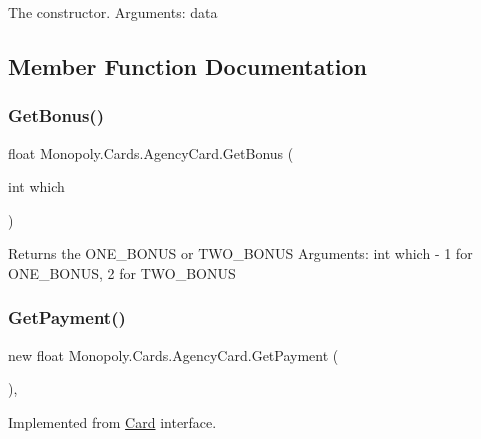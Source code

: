 The constructor. Arguments\+: data 

\subsection{Member Function Documentation}
\mbox{\label{class_monopoly_1_1_cards_1_1_agency_card_af4892a0f8424badd42a01306e705e619}} 
\subsubsection{\texorpdfstring{Get\+Bonus()}{GetBonus()}}
{\footnotesize\ttfamily float Monopoly.\+Cards.\+Agency\+Card.\+Get\+Bonus (\begin{DoxyParamCaption}\item[{int}]{which }\end{DoxyParamCaption})\hspace{0.3cm}{\ttfamily [inline]}}

Returns the O\+N\+E\+\_\+\+B\+O\+N\+US or T\+W\+O\+\_\+\+B\+O\+N\+US Arguments\+: int which -\/ 1 for O\+N\+E\+\_\+\+B\+O\+N\+US, 2 for T\+W\+O\+\_\+\+B\+O\+N\+US \mbox{\label{class_monopoly_1_1_cards_1_1_agency_card_a7463b9f93db864ea03b2e0d6b2973e41}} 
\subsubsection{\texorpdfstring{Get\+Payment()}{GetPayment()}\hspace{0.1cm}{\footnotesize\ttfamily [1/2]}}
{\footnotesize\ttfamily new float Monopoly.\+Cards.\+Agency\+Card.\+Get\+Payment (\begin{DoxyParamCaption}{ }\end{DoxyParamCaption})\hspace{0.3cm}{\ttfamily [inline]}, {\ttfamily [virtual]}}

Implemented from \mbox{\hyperlink{class_monopoly_1_1_cards_1_1_card}{Card}} interface. 

